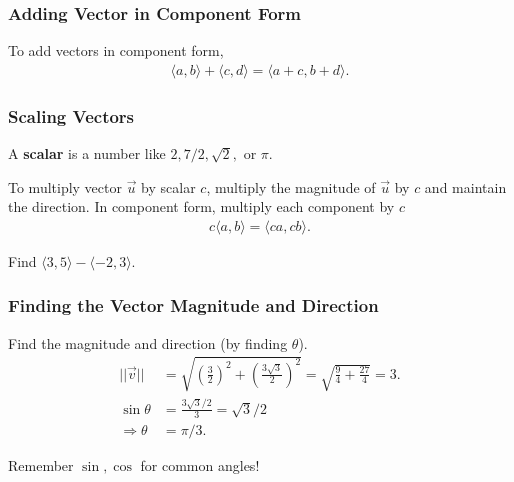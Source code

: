 \documentclass[20pt]{beamer}
\begin{document}
\begin{frame}
	\frametitle{Adding Vector in Component Form}
	\begin{figure}[ht]
		\centering
		\label{fig:vectorcomponentaddition}
	\end{figure}
	\begin{definition}
		To add vectors in component form,
		\begin{align*}
			\langle a, b \rangle + \langle c, d \rangle = \langle a + c, b + d\rangle.
		\end{align*}
	\end{definition}
\end{frame}

\begin{frame}
	\frametitle{Scaling Vectors}
	\begin{figure}[ht]
		\centering
		\label{fig:scalarmultiplication}
	\end{figure}
	\begin{definition}
		A \textbf{scalar} is a number like $2, 7/2, \sqrt{2},$ or $\pi$.
	\end{definition}
	\begin{definition}
		To multiply vector $\vec{u}$ by scalar $c$, multiply the magnitude of $\vec{u}$ by $c$ and maintain the direction.
		In component form, multiply each component by $c$
		\begin{align*}
			c\langle a, b \rangle = \langle ca, cb\rangle.
		\end{align*}
	\end{definition}
	\begin{example}
		Find $\langle 3, 5\rangle - \langle -2, 3\rangle$.
	\end{example}
\end{frame}

\begin{frame}
	\frametitle{Finding the Vector Magnitude and Direction}
	\begin{figure}[ht]
		\centering
		\label{fig:vectormagdir}
	\end{figure}
	\begin{example}
		Find the magnitude and direction (by finding $\theta$).
		\begin{align*}
			||\vec{v}||        & = \sqrt{\left(\frac{3}{2}\right)^2 + \left(\frac{3 \sqrt{3}}{2}\right)^2} = \sqrt{\frac{9}{4} + \frac{27}{4}} = 3. \\
			\sin \theta        & = \frac{3 \sqrt{3} / 2}{3} = \sqrt{3} / 2                                                                          \\
			\Rightarrow \theta & = \pi / 3.
		\end{align*}
	\end{example}
	Remember $\sin, \cos$ for common angles!
\end{frame}
\end{document}
